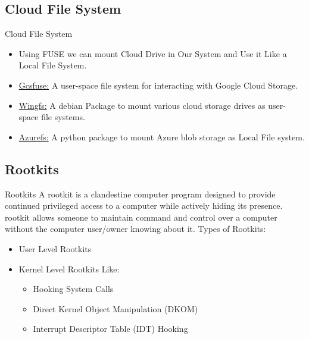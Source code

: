 \documentclass{beamer}
\begin{document}
\subsection{Cloud File System}
\begin{frame}{Cloud File System}
	\begin{itemize}
	\item{Using FUSE we can mount Cloud Drive in Our System and Use it Like a Local File System.
	}
	\bigskip
	
	 \item \href{https://github.com/GoogleCloudPlatform/gcsfuse}{Gcsfuse:} A user-space file system for interacting with Google Cloud Storage.
	 \bigskip
	 
	 \item \href{http://www.archiware.com/products/wingfs}{Wingfs:} A debian Package to mount various cloud storage drives as user-space file systems.
	 \bigskip 
	 \item \href{https://ahmetalpbalkan.com/blog/introducing-azurefs/}{Azurefs:} A python package to mount Azure blob storage as Local File system.
	 \end{itemize}	   	
\end{frame}
\subsection{Rootkits}
\begin{frame}{Rootkits}
A rootkit is a clandestine computer program designed to provide continued privileged access to a computer while actively hiding its presence. rootkit allows someone to maintain command and control over a computer without the computer user/owner knowing about it.
Types of Rootkits:
\begin{itemize}
\item User Level Rootkits
\item Kernel Level Rootkits Like:
\begin{itemize}
      \item{Hooking System Calls}
      \item{Direct Kernel Object Manipulation (DKOM)}
      \item{Interrupt Descriptor Table (IDT) Hooking}
    \end{itemize}
\end{itemize}

\end{frame}
\end{document}
